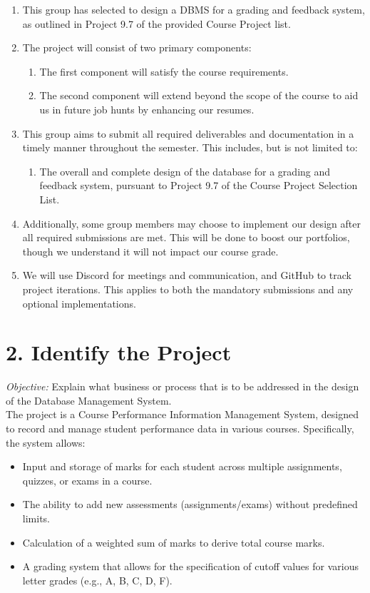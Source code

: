 \documentclass[12pt]{article}
\begin{document}
\begin{enumerate}
    \item This group has selected to design a DBMS for a grading and feedback system, as outlined in Project 9.7 of the provided Course Project list.
    \item The project will consist of two primary components:
    \begin{enumerate}
        \item The first component will satisfy the course requirements.
        \item The second component will extend beyond the scope of the course to aid us in future job hunts by enhancing our resumes.
    \end{enumerate}
    \item This group aims to submit all required deliverables and documentation in a timely manner throughout the semester. This includes, but is not limited to:
    \begin{enumerate}
        \item The overall and complete design of the database for a grading and feedback system, pursuant to Project 9.7 of the Course Project Selection List.
    \end{enumerate}
    \item Additionally, some group members may choose to implement our design after all required submissions are met. This will be done to boost our portfolios, though we understand it will not impact our course grade.
    \item We will use Discord for meetings and communication, and GitHub to track project iterations. This applies to both the mandatory submissions and any optional implementations.
\end{enumerate}

\section*{2. Identify the Project}
\textit{Objective:} Explain what business or process that is to be addressed in the design of the Database Management System. \\

\noindent
The project is a Course Performance Information Management System, designed to record and manage student performance data in various courses. Specifically, the system allows:
\begin{itemize}
\item Input and storage of marks for each student across multiple assignments, quizzes, or exams in a course.
\item The ability to add new assessments (assignments/exams) without predefined limits.
\item Calculation of a weighted sum of marks to derive total course marks.
\item A grading system that allows for the specification of cutoff values for various letter grades (e.g., A, B, C, D, F).
\end{itemize}
\end{document}
